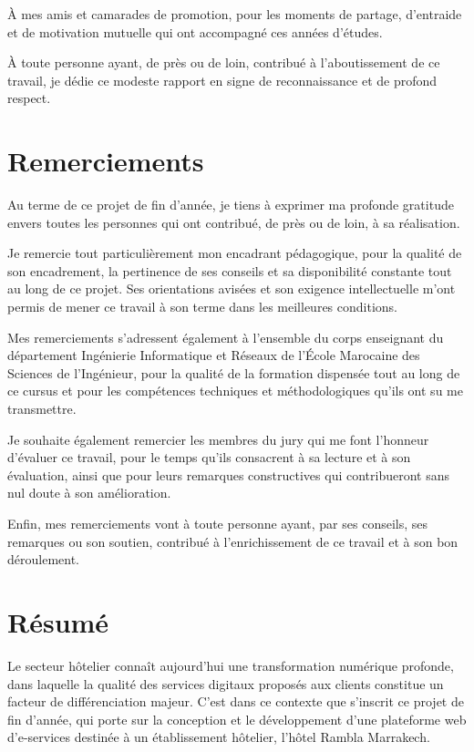 \documentclass[12pt,a4paper]{report}
\begin{document}
À mes amis et camarades de promotion, pour les moments de partage,
d'entraide et de motivation mutuelle qui ont accompagné ces années
d'études.

À toute personne ayant, de près ou de loin, contribué à l'aboutissement de
ce travail, je dédie ce modeste rapport en signe de reconnaissance et de
profond respect.

\clearpage

\chapter*{Remerciements}

Au terme de ce projet de fin d'année, je tiens à exprimer ma profonde
gratitude envers toutes les personnes qui ont contribué, de près ou de
loin, à sa réalisation.

Je remercie tout particulièrement mon encadrant pédagogique, pour la
qualité de son encadrement, la pertinence de ses conseils et sa
disponibilité constante tout au long de ce projet. Ses orientations
avisées et son exigence intellectuelle m'ont permis de mener ce travail à
son terme dans les meilleures conditions.

Mes remerciements s'adressent également à l'ensemble du corps enseignant
du département Ingénierie Informatique et Réseaux de l'École Marocaine des
Sciences de l'Ingénieur, pour la qualité de la formation dispensée tout au
long de ce cursus et pour les compétences techniques et méthodologiques
qu'ils ont su me transmettre.

Je souhaite également remercier les membres du jury qui me font l'honneur
d'évaluer ce travail, pour le temps qu'ils consacrent à sa lecture et à
son évaluation, ainsi que pour leurs remarques constructives qui
contribueront sans nul doute à son amélioration.

Enfin, mes remerciements vont à toute personne ayant, par ses conseils,
ses remarques ou son soutien, contribué à l'enrichissement de ce travail
et à son bon déroulement.

\clearpage

\chapter*{Résumé}

Le secteur hôtelier connaît aujourd'hui une transformation numérique
profonde, dans laquelle la qualité des services digitaux proposés aux
clients constitue un facteur de différenciation majeur. C'est dans ce
contexte que s'inscrit ce projet de fin d'année, qui porte sur la
conception et le développement d'une plateforme web d'e-services destinée
à un établissement hôtelier, l'hôtel Rambla Marrakech.
\end{document}
